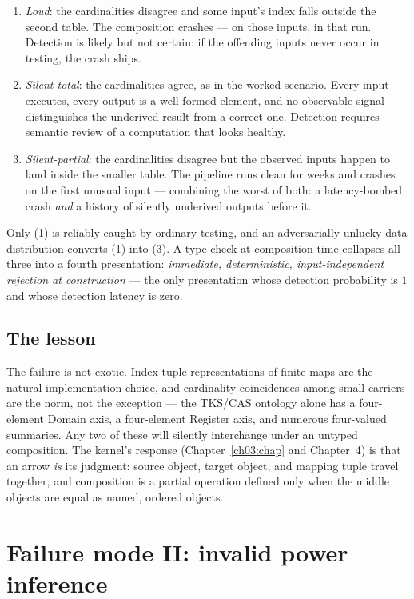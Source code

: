 \begin{enumerate}
\item \emph{Loud}: the cardinalities disagree and some input's index
falls outside the second table. The composition crashes --- on those
inputs, in that run. Detection is likely but not certain: if the
offending inputs never occur in testing, the crash ships.
\item \emph{Silent-total}: the cardinalities agree, as in the worked
scenario. Every input executes, every output is a well-formed element,
and no observable signal distinguishes the underived result from a
correct one. Detection requires semantic review of a computation that
looks healthy.
\item \emph{Silent-partial}: the cardinalities disagree but the
observed inputs happen to land inside the smaller table. The pipeline
runs clean for weeks and crashes on the first unusual input ---
combining the worst of both: a latency-bombed crash \emph{and} a
history of silently underived outputs before it.
\end{enumerate}

Only (1) is reliably caught by ordinary testing, and an adversarially
unlucky data distribution converts (1) into (3). A type check at
composition time collapses all three into a fourth presentation:
\emph{immediate, deterministic, input-independent rejection at
construction} --- the only presentation whose detection probability is
$1$ and whose detection latency is zero.

\subsection{The lesson}

The failure is not exotic. Index-tuple representations of finite maps are the
natural implementation choice, and cardinality coincidences among small
carriers are the norm, not the exception --- the TKS/CAS ontology alone has a
four-element Domain axis, a four-element Register axis, and numerous
four-valued summaries. Any two of these will silently interchange under an
untyped composition. The kernel's response (Chapter~\ref{ch03:chap} and
Chapter~4) is that an arrow \emph{is} its judgment: source object, target
object, and mapping tuple travel together, and composition is a partial
operation defined only when the middle objects are equal as named, ordered
objects.

\section{Failure mode II: invalid power inference}\label{ch01:sec:power}

